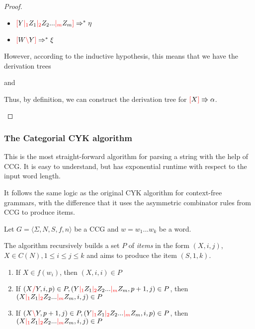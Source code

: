 \documentclass[main.tex]{subfiles}
\begin{document}
\begin{proof}
\begin{itemize}
\begin{itemize}
                \item $\textcolor{red}{[} Y \textcolor{red}{|_{1}} Z_1 \textcolor{red}{|_{2}} Z_2 ... \textcolor{red}{|_{m}} Z_m \textcolor{red}{]} \Rightarrow^* \eta$
                \item $\textcolor{red}{[} W \textcolor{red}{\backslash} Y \textcolor{red}{]} \Rightarrow^* \xi$
            \end{itemize}
            However, according to the inductive hypothesis, this means that we
            have the derivation trees
            \begin{center}
                and
            \end{center}
            Thus, by definition, we can construct the derivation tree
            for $\textcolor{red}{[} X \textcolor{red}{]} \Rrightarrow \alpha$.
    \end{itemize}
\end{proof}

\subsubsection{The Categorial CYK algorithm}

This is the most straight-forward algorithm for parsing a string with the help
of CCG. It is easy to understand, but has exponential runtime with respect to
the input word length.

It follows the same logic as the original CYK algorithm for context-free
grammars, with the difference that it uses the asymmetric combinator rules
from CCG to produce items.

Let $ G = \langle \Sigma, N, S, f, n \rangle $ be a CCG and $w = w_1 ... w_k$
be a word.

The algorithm recursively builds a set $P$ of \emph{items} in the form
$(X, i, j)$, $X \in C(N), 1 \leq i \leq j \leq k$ and aims to produce the item
$(S, 1, k)$.

\begin{enumerate}
\label{cyk:rules}
    \item If $X \in f(w_i)$, then $(X, i, i) \in P$
    \item If $(X \textcolor{red}{/} Y, i, p) \in P, (Y \textcolor{red}{|_{1}} Z_1 \textcolor{red}{|_{2}} Z_2 ... \textcolor{red}{|_{m}} Z_m, p + 1, j) \in P$,
        then $(X \textcolor{red}{|_{1}} Z_1 \textcolor{red}{|_{2}} Z_2 ... \textcolor{red}{|_{m}} Z_m, i, j) \in P$
    \item If $(X \textcolor{red}{\backslash} Y, p + 1, j) \in P, (Y \textcolor{red}{|_{1}} Z_1 \textcolor{red}{|_{2}} Z_2 ... \textcolor{red}{|_{m}} Z_m, i, p) \in P$,
        then $(X \textcolor{red}{|_{1}} Z_1 \textcolor{red}{|_{2}} Z_2 ... \textcolor{red}{|_{m}} Z_m, i, j) \in P$
\end{enumerate}
\end{document}
